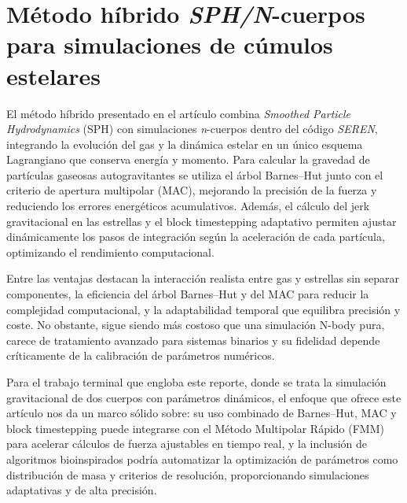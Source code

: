 \section[Método híbrido \textit{SPH/N}-cuerpos]{Método híbrido \textit{SPH/N}-cuerpos para simulaciones de cúmulos estelares}%
\label{sec:state_of_the_art_05}

El método híbrido presentado en el artículo combina \textit{Smoothed Particle Hydrodynamics} (SPH) con simulaciones \textit{n}-cuerpos dentro del código \textit{SEREN}, integrando la evolución del gas y la dinámica estelar en un único esquema Lagrangiano que conserva energía y momento. Para calcular la gravedad de partículas gaseosas autogravitantes se utiliza el árbol Barnes–Hut junto con el criterio de apertura multipolar (MAC), mejorando la precisión de la fuerza y reduciendo los errores energéticos acumulativos. Además, el cálculo del jerk gravitacional en las estrellas y el block timestepping adaptativo permiten ajustar dinámicamente los pasos de integración según la aceleración de cada partícula, optimizando el rendimiento computacional.

Entre las ventajas destacan la interacción realista entre gas y estrellas sin separar componentes, la eficiencia del árbol Barnes–Hut y del MAC para reducir la complejidad computacional, y la adaptabilidad temporal que equilibra precisión y coste. No obstante, sigue siendo más costoso que una simulación N-body pura, carece de tratamiento avanzado para sistemas binarios y su fidelidad depende críticamente de la calibración de parámetros numéricos.

Para el trabajo terminal que engloba este reporte, donde se trata la simulación gravitacional de dos cuerpos con parámetros dinámicos, el enfoque que ofrece este artículo nos da un marco sólido sobre: su uso combinado de Barnes–Hut, MAC y block timestepping puede integrarse con el Método Multipolar Rápido (FMM) para acelerar cálculos de fuerza ajustables en tiempo real, y la inclusión de algoritmos bioinspirados podría automatizar la optimización de parámetros como distribución de masa y criterios de resolución, proporcionando simulaciones adaptativas y de alta precisión.

